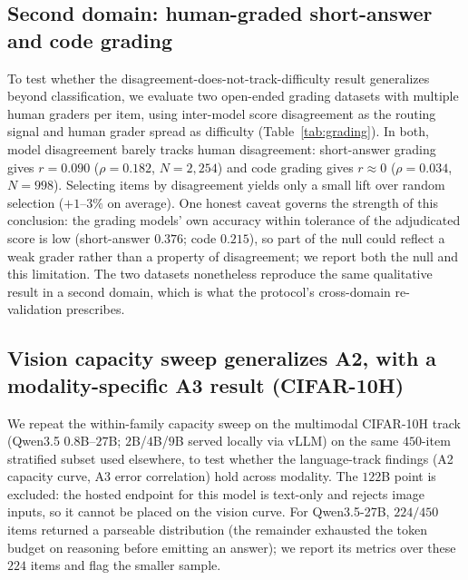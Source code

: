 \documentclass[letterpaper]{article} %
\begin{document}
\subsection{Second domain: human-graded short-answer and code grading}
To test whether the disagreement-does-not-track-difficulty result generalizes
beyond classification, we evaluate two open-ended grading datasets with multiple
human graders per item, using inter-model score disagreement as the routing signal
and human grader spread as difficulty (Table~\ref{tab:grading}). In both, model
disagreement barely tracks human disagreement: short-answer grading gives
$r{=}0.090$ ($\rho{=}0.182$, $N{=}2{,}254$) and code grading gives $r{\approx}0$
($\rho{=}0.034$, $N{=}998$). Selecting items by disagreement yields only a small
lift over random selection ($+1$--$3\%$ on average). One honest caveat governs the
strength of this conclusion: the grading models' own accuracy within tolerance of
the adjudicated score is low (short-answer $0.376$; code $0.215$), so part of the
null could reflect a weak grader rather than a property of disagreement; we report
both the null and this limitation. The two datasets nonetheless reproduce the same
qualitative result in a second domain, which is what the protocol's cross-domain
re-validation prescribes.

\begin{table}[t]
\centering
\small
{}
\caption{Open-ended grading (second domain). Model disagreement does not track
human grading disagreement; selecting by disagreement gives only a small mean lift
over random. ``lift'' is the mean accuracy gain over random selection across
coverage; ``grader acc'' is model accuracy within tolerance of the adjudicated
score (a limitation, see text).}
\label{tab:grading}
\end{table}

\subsection{Vision capacity sweep generalizes A2, with a modality-specific
A3 result (CIFAR-10H)}
We repeat the within-family capacity sweep on the multimodal CIFAR-10H track
(Qwen3.5 $0.8$B--$27$B; $2$B/$4$B/$9$B served locally via vLLM) on the same
$450$-item stratified subset used elsewhere, to test whether the language-track
findings (A2 capacity curve, A3 error correlation) hold across modality. The
$122$B point is excluded: the hosted endpoint for this model is
text-only and rejects image inputs, so it cannot be placed on the vision curve.
For Qwen3.5-27B, $224/450$ items returned a parseable distribution (the remainder
exhausted the token budget on reasoning before emitting an answer); we report its
metrics over these $224$ items and flag the smaller sample.
\end{document}
